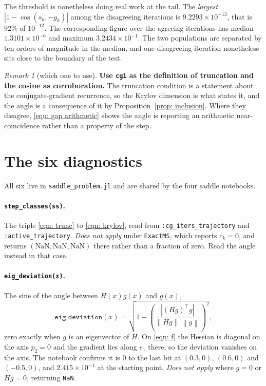 \documentclass[11pt,a4paper]{article}
\providecommand{\abs}[1]{\left \vert #1 \right \vert}
\providecommand{\norm}[1]{\left \lVert #1 \right \rVert}
\theoremstyle{remark}
\newtheorem{remark}{Remark}
\begin{document}
The threshold is nonetheless doing real work at the tail. The \emph{largest}
$\abs{1 - \cos(s_k,-g_k)}$ among the disagreeing iterations is
$9.2293\times10^{-13}$, that is $92\%$ of $10^{-12}$. The corresponding figure
over the agreeing iterations has median $1.3101\times10^{-6}$ and maximum
$3.2434\times10^{-1}$. The two populations are separated by ten orders of
magnitude in the median, and one disagreeing iteration nonetheless sits close to
the boundary of the test.

\begin{remark}[which one to use]\label{rem: which}
  \textbf{Use \texttt{cg1} as the definition of truncation and the cosine as
  corroboration.} The truncation condition is a statement about the
  conjugate-gradient recurrence, so the Krylov dimension is what states it, and
  the angle is a consequence of it by Proposition~\ref{prop: inclusion}. Where
  they disagree, \eqref{eqn: gap arithmetic} shows the angle is reporting an
  arithmetic near-coincidence rather than a property of the step.
\end{remark}

\section{The six diagnostics}\label{sec: six}

All six live in \texttt{saddle\_problem.jl} and are shared by the four saddle
notebooks.

\paragraph{\texttt{step\_classes(ss)}.}
The triple \eqref{eqn: trunc} to \eqref{eqn: krylov}, read from
\texttt{:cg\_iters\_trajectory} and \texttt{:active\_trajectory}.
\emph{Does not apply} under \texttt{ExactMS}, which reports $c_k = 0$, and
returns $(\mathrm{NaN}, \mathrm{NaN}, \mathrm{NaN})$ there rather than a fraction
of zero. Read the angle instead in that case.

\paragraph{\texttt{eig\_deviation(x)}.}
The sine of the angle between $H(x)g(x)$ and $g(x)$,
\begin{equation}
  \texttt{eig\_deviation}(x)
    = \sqrt{1 - \left(\frac{\abs{(Hg)^{\!\top}g}}{\norm{Hg}\,\norm{g}}\right)^{\!2}},
  \label{eqn: eigdev}
\end{equation}
zero exactly when $g$ is an eigenvector of $H$. On \eqref{eqn: f} the Hessian is
diagonal on the axis $p_2 = 0$ and the gradient lies along $e_1$ there, so the
deviation vanishes on the axis. The notebook confirms it is $0$ to the last bit
at $(0.3, 0)$, $(0.6, 0)$ and $(-0.5, 0)$, and $2.415\times10^{-1}$ at the
starting point. \emph{Does not apply} where $g = 0$ or $Hg = 0$, returning
\texttt{NaN}.
\end{document}

